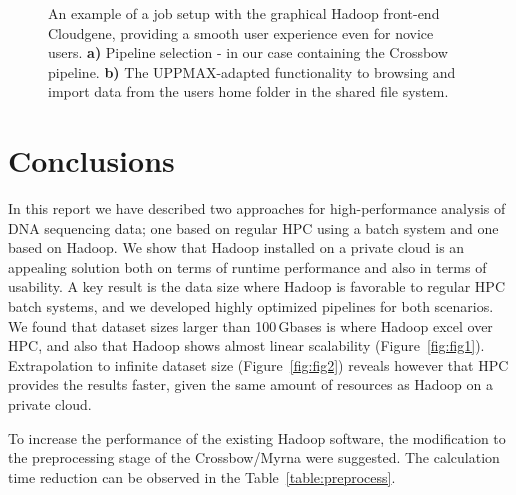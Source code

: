 \documentclass[11pt, oneside]{article}   	%
\begin{document}
\begin{figure}
\begin{subfigure}[b]{0.6\textwidth}
		\subcaption{}
	\end{subfigure}
	\caption{An example of a job setup with the graphical Hadoop front-end Cloudgene, providing a smooth user experience even for novice users. \textbf{a)} Pipeline selection - in our case containing the Crossbow pipeline. \textbf{b)} The UPPMAX-adapted functionality to browsing and import data from the users home folder in the shared file system.}
	\label{fig:fig4}
\end{figure}

\section{Conclusions}
\label{sectionV}

In this report we have described two approaches for high-performance analysis of DNA sequencing data; one based on regular HPC using a batch system and one based on Hadoop. We show that Hadoop installed on a private cloud is an appealing solution both on terms of runtime performance and also in terms of usability. A key result is the data size where Hadoop is favorable to regular HPC batch systems, and we developed highly optimized pipelines for both scenarios. We found that dataset sizes larger than 100\,Gbases is where Hadoop excel over HPC, and also that Hadoop shows almost linear scalability (Figure~\ref{fig:fig1}). Extrapolation to infinite dataset size (Figure~\ref{fig:fig2}) reveals however that HPC provides the results faster, given the same amount of resources as Hadoop on a private cloud.

To increase the performance of the existing Hadoop software, the modification to the preprocessing stage of the Crossbow/Myrna  were suggested.  The calculation time reduction can be observed in the Table~\ref{table:preprocess}.

\end{document}
